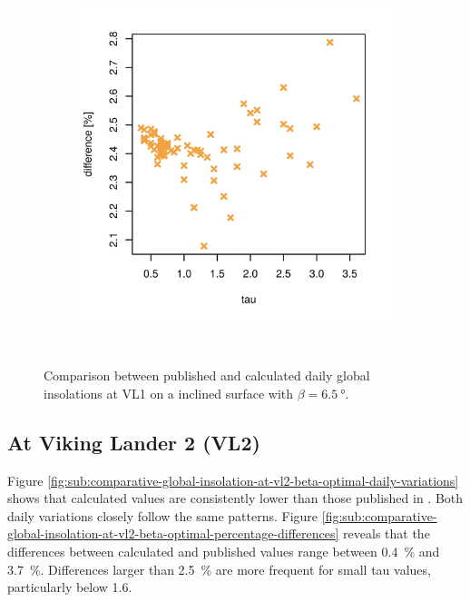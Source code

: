 \begin{figure}[H]
\begin{subfigure}[t]{\subfigureWidth}
            \includegraphics[height=\graphicsHeight]{sections/appendix/insolation-calculation-verification/plots/h-diff-bet-exp-calc-at-vl1-with-beta-65-deg.png}
            \label{fig:sub:comparative-global-insolation-at-vl1-beta-optimal-percentage-differences}
    \end{subfigure}\\[0.8ex]
    \caption{Comparison between published and calculated daily global insolations at \ac{VL1} on a inclined surface with $\beta=\SI{6.5}{\degree}$.}
    \label{fig:plot:comparative-global-insolation-at-vl1-beta-optimal}
\vspace{-2ex}
\end{figure}

\subsection{At Viking Lander 2 (VL2)}
Figure \ref{fig:sub:comparative-global-insolation-at-vl2-beta-optimal-daily-variations} shows that calculated values are consistently lower than those published in . Both daily variations closely follow the same patterns. Figure \ref{fig:sub:comparative-global-insolation-at-vl2-beta-optimal-percentage-differences} reveals that the differences between calculated and published values range between \SI{0.4}{\percent} and \SI{3.7}{\percent}. Differences larger than \SI{2.5}{\percent} are more frequent for small tau values, particularly below 1.6.

